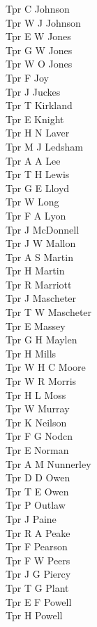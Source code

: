 \begin{multicols}{2}
  Tpr C Johnson \\
  Tpr W J Johnson \\
  Tpr E W Jones \\
  Tpr G W Jones \\
  Tpr W O Jones \\
  Tpr F Joy \\
  Tpr J Juckes \\
  Tpr T Kirkland \\
  Tpr E Knight \\
  Tpr H N Laver \\
  Tpr M J Ledsham \\
  Tpr A A Lee \\
  Tpr T H Lewis \\
  Tpr G E Lloyd \\
  Tpr W Long \\
  Tpr F A Lyon \\
  Tpr J McDonnell \\
  Tpr J W Mallon \\
  Tpr A S Martin \\
  Tpr H Martin \\
  Tpr R Marriott \\
  Tpr J Mascheter \\
  Tpr T W Mascheter \\
  Tpr E Massey \\
  Tpr G H Maylen \\
  Tpr H Mills \\
  Tpr W H C Moore \\
  Tpr W R Morris \\
  Tpr H L Moss \\
  Tpr W Murray \\
  Tpr K Neilson \\
  Tpr F G Nodcn \\
  Tpr E Norman \\
  Tpr A M Nunnerley \\
  Tpr D D Owen \\
  Tpr T E Owen \\
  Tpr P Outlaw \\
  Tpr J Paine \\
  Tpr R A Peake \\
  Tpr F Pearson \\
  Tpr F W Peers \\
  Tpr J G Piercy \\
  Tpr T G Plant \\
  Tpr E F Powell \\
  Tpr H Powell \\

\end{multicols}
